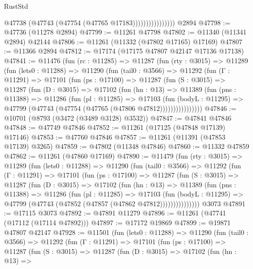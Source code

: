 \begin{lexlean}{RustStd}
\begin{coremodule}
                            @47738 (@47743 (@47754 (@47765 @17183))))))))))))))))
    @2894
@47798 := @47736 (@11278 @2894)
@47799 := @11261 @47798
@47802 := @11340 (@11341 @2894) @42144
@47806 := @11261 (@11332 (@47802 @17165) @17169)
@47807 := @11366 @2894
@47812 := @17174 (@17175 @47807 @42147 @17136 @17138)
@47841 := @11476
    (fun (rc : @11285) =>
    @11287
      (fun (rty : @3015) =>
      @11289
        (fun (lets0 : @11288) =>
        @11290
          (fun (tail0 : @3566) =>
          @11292
            (fun (Γ : @11291) =>
            @17101
              (fun (ps : @17100) =>
              @11287
                (fun (S : @3015) =>
                @11287
                  (fun (D : @3015) =>
                  @17102
                    (fun (hn : @13) =>
                    @11389
                      (fun (pns : @11388) =>
                      @11286
                        (fun (pl : @11285) =>
                        @17103
                          (fun (bodyL : @11295) =>
                          @47799 (@47743 (@47754 (@47765 (@47806 @47812))))))))))))))))
@47846 := @10701 (@8793 (@3472 (@3489 @3128) @3532))
@47847 := @47841 @47846
@47848 := @47749 @47846
@47852 := @11261 (@17125 (@47848 @17139) @17146)
@47853 := @47760 @47846
@47857 := @11261 (@11391 (@47853 @17139) @3265)
@47859 := @47802 (@11348 @47846)
@47860 := @11332 @47859
@47862 := @11261 (@47860 @17169)
@47890 := @11479
    (fun (rty : @3015) =>
    @11289
      (fun (lets0 : @11288) =>
      @11290
        (fun (tail0 : @3566) =>
        @11292
          (fun (Γ : @11291) =>
          @17101
            (fun (ps : @17100) =>
            @11287
              (fun (S : @3015) =>
              @11287
                (fun (D : @3015) =>
                @17102
                  (fun (hn : @13) =>
                  @11389
                    (fun (pns : @11388) =>
                    @11286
                      (fun (pl : @11285) =>
                      @17103
                        (fun (bodyL : @11295) =>
                        @47799 (@47743 (@47852 (@47857 (@47862 @47812)))))))))))))))
    @3073
@47891 := @17115 @3073
@47892 := @47891 @11279
@47896 := @11261 (@47741 (@17112 (@17114 @47892)))
@47897 := @17172 @19869
@47899 := @19871 @47807 @42147
@47928 := @11501
    (fun (lets0 : @11288) =>
    @11290
      (fun (tail0 : @3566) =>
      @11292
        (fun (Γ : @11291) =>
        @17101
          (fun (ps : @17100) =>
          @11287
            (fun (S : @3015) =>
            @11287
              (fun (D : @3015) =>
              @17102
                (fun (hn : @13) =>

\end{coremodule}
\end{lexlean}
